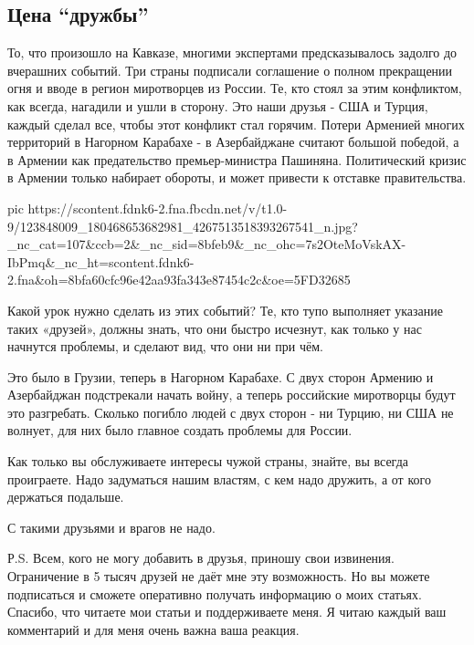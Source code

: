  
 
 

\subsection{Цена \enquote{дружбы}}
\label{sec:10_11_2020.fb.alex_belyy.1.cena_druzhby_kavkaz}

То, что произошло на Кавказе, многими экспертами предсказывалось задолго до
вчерашних событий. Три страны подписали соглашение о полном прекращении огня и
вводе в регион миротворцев из России. Те, кто стоял за этим конфликтом, как
всегда, нагадили и ушли в сторону. Это наши друзья - США и Турция, каждый
сделал все, чтобы этот конфликт стал горячим. Потери Арменией многих территорий
в Нагорном Карабахе - в Азербайджане считают большой победой, а в Армении как
предательство премьер-министра Пашиняна. Политический кризис в Армении только
набирает обороты, и может привести к отставке правительства.

\ifcmt
pic https://scontent.fdnk6-2.fna.fbcdn.net/v/t1.0-9/123848009_180468653682981_4267513518393267541_n.jpg?_nc_cat=107&ccb=2&_nc_sid=8bfeb9&_nc_ohc=7s2OteMoVskAX-IbPmq&_nc_ht=scontent.fdnk6-2.fna&oh=8bfa60cfc96e42aa93fa343e87454c2c&oe=5FD32685
\fi

Какой урок нужно сделать из этих событий? Те, кто тупо выполняет указание таких
«друзей», должны знать, что они быстро исчезнут, как только у нас начнутся
проблемы, и сделают вид, что они ни при чём. 

Это было в Грузии, теперь в Нагорном Карабахе. С двух сторон Армению и
Азербайджан подстрекали начать войну, а теперь российские миротворцы будут это
разгребать. Сколько погибло людей с двух сторон - ни Турцию, ни США не волнует,
для них было главное создать проблемы для России. 

Как только вы обслуживаете интересы чужой страны, знайте, вы всегда проиграете.
Надо задуматься нашим властям, с кем надо дружить, а от кого держаться
подальше.  

С такими друзьями и врагов не надо.         

Р.S. Всем, кого не могу добавить в друзья, приношу свои извинения. Ограничение
в 5 тысяч друзей не даёт мне эту возможность. Но вы можете подписаться и
сможете оперативно получать информацию о моих статьях. Спасибо, что читаете мои
статьи и поддерживаете меня. Я читаю каждый ваш комментарий и для меня очень
важна ваша реакция.

